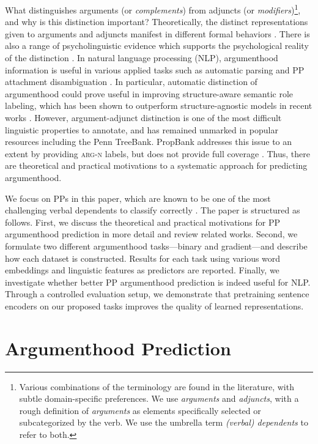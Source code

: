 \documentclass[letterpaper]{article} %
\begin{document}
\noindent What distinguishes arguments (or \textit{complements}) from adjuncts (or \textit{modifiers})\footnote{Various combinations of the terminology are found in the literature, with subtle domain-specific preferences. We use \textit{arguments} and \textit{adjuncts}, with a rough definition of \textit{arguments} as elements specifically selected or subcategorized by the verb. We use the umbrella term \textit{(verbal) dependents} to refer to both.}, and why is this distinction important? Theoretically, the distinct representations given to arguments and adjuncts manifest in different formal behaviors \cite{chomsky1993lectures,steedman2000syntactic}. There is also a range of psycholinguistic evidence which supports the psychological reality of the distinction \cite{tutunjian2008we}. In natural language processing (NLP), argumenthood information is useful in various applied tasks such as automatic parsing \cite{briscoe1998can} and PP attachment disambiguation \cite{merlo2006notion}. In particular, automatic distinction of argumenthood could prove useful in improving structure-aware semantic role labeling, which has been shown to outperform structure-agnostic models in recent works \cite{marcheggiani2017encoding}. However, argument-adjunct distinction is one of the most difficult linguistic properties to annotate, and has remained unmarked in popular resources including the Penn TreeBank. PropBank \cite{palmer2005proposition} addresses this issue to an extent by providing \textsc{arg-n} labels, but does not provide full coverage \cite{hockenmaier2002acquiring}. Thus, there are theoretical and practical motivations to a systematic approach for predicting argumenthood. 

We focus on PPs in this paper, which are known to be one of the most challenging verbal dependents to classify correctly \cite{abend2010fully}. The paper is structured as follows. First, we discuss the theoretical and practical motivations for PP argumenthood prediction in more detail and review related works. Second, we formulate two different argumenthood tasks---binary and gradient---and describe how each dataset is constructed. Results for each task using various word embeddings and linguistic features as predictors are reported. Finally, we investigate whether better PP argumenthood prediction is indeed useful for NLP. Through a controlled evaluation setup, we demonstrate that pretraining sentence encoders on our proposed tasks improves the quality of learned representations.

\section{Argumenthood Prediction}
\label{theoretical}
\end{document}
